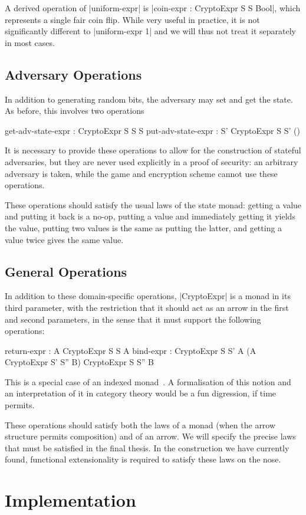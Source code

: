 A derived operation of |uniform-expr| is |coin-expr :  \to CryptoExpr S S Bool|, which represents a single
fair coin flip.  While very useful in practice, it is not significantly different to |uniform-expr 1| and we will thus
not treat it separately in most cases.

\subsection{Adversary Operations}

In addition to generating random bits, the adversary may set and get the state.  As before, this involves two operations
\begin{code}
    get-adv-state-expr :  \to CryptoExpr S S S
    put-adv-state-expr :  \to S' \to CryptoExpr S S' ()
\end{code}

It is necessary to provide these operations to allow for the construction of stateful adversaries, but they are never
used explicitly in a proof of security: an arbitrary adversary is taken, while the game and encryption scheme cannot use
these operations.

These operations should satisfy the usual laws of the state monad: getting a value and putting it back is a no-op,
putting a value and immediately getting it yields the value, putting two values is the same as putting the latter, and
getting a value twice gives the same value.

\subsection{General Operations}

In addition to these domain-specific operations, |CryptoExpr| is a monad in its third parameter, with the restriction
that it should act as an arrow in the first and second parameters, in the sense that it must support the following
operations:
\begin{code}
    return-expr :  \to A \to CryptoExpr S S A
    bind-expr :  \to CryptoExpr S S' A
              \to (A \to CryptoExpr S' S'' B)
              \to CryptoExpr S S'' B
\end{code}

This is a special case of an indexed monad~\cite{indexedmonads}.  A formalisation of this notion and an interpretation
of it in category theory would be a fun digression, if time permits.

These operations should satisfy both the laws of a monad (when the arrow structure permits composition) and of an arrow.
We will specify the precise laws that must be satisfied in the final thesis.  In the construction we have currently
found, functional extensionality is required to satisfy these laws on the nose.

\section{Implementation}




